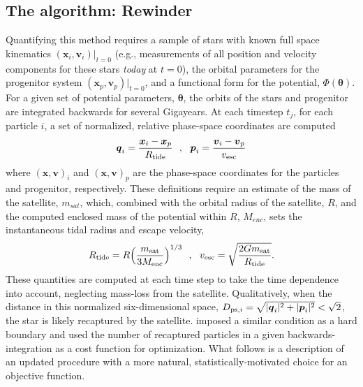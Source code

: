 \documentclass{emulateapj}
\newcommand{\bs}{\boldsymbol}
\begin{document}
\subsection{The algorithm: Rewinder}
Quantifying this method requires a sample of stars with known full
space kinematics $(\bs{x}_{i}, \bs{v}_{i})|_{t=0}$ (e.g., measurements
of all position and velocity components for these stars \emph{today}
at $t=0$), the orbital parameters for the progenitor system
$(\bs{x}_p, \bs{v}_p)|_{t=0}$, and a functional form for the
potential, $\Phi({\boldsymbol\theta})$. For a given set of potential
parameters, $\boldsymbol\theta$, the orbits of the stars and
progenitor are integrated backwards for several Gigayears. At
each timestep $t_j$, for each particle $i$, a set of normalized,
relative phase-space coordinates are computed
\begin{equation}
  \bs{q}_{i} = \frac{\bs{x}_{i} -
    \bs{x}_{p}}{R_{\rm tide}}\,\,\,\,,\,\,\,\,\bs{p}_{i} = \frac{\bs{v}_{i} -
    \bs{v}_{p}}{v_{\rm esc}}
\end{equation}
where $(\bs{x},\bs{v})_{i}$ and $(\bs{x},\bs{v})_{p}$ are the
phase-space coordinates for the particles and progenitor,
respectively. These definitions require an estimate of the mass of the
satellite, $m_{sat}$, which, combined with the orbital radius of the
satellite, $R$, and the computed enclosed mass of the potential within
$R$, $M_{enc}$, sets the instantaneous tidal radius and escape
velocity,
\begin{equation}
  R_{\rm tide}=R\Big(\frac{m_{\rm sat}}{3M_{\rm enc}}\Big)^{1/3}\,\,\,\,,\,\,\,\,
  v_{\rm esc}=\sqrt{\frac{2Gm_{\rm sat}}{R_{\rm tide}}}.
\end{equation}
These quantities are computed at each time step to take the time 
dependence into account, neglecting mass-loss from the satellite.
Qualitatively, when the distance in this normalized six-dimensional
space, $D_{{\rm ps},i}=\sqrt{|\bs{q}_{i}|^2+|\bs{p}_{i}|^2} <
\sqrt{2}$, the star is likely recaptured by the
satellite. \citet{johnston99a} imposed a similar
condition as a hard boundary and used the number of recaptured
particles in a given backwards-integration as a cost function for
optimization. What follows is a description of an updated procedure
with a more natural, statistically-motivated choice for an objective
function.
\end{document}
